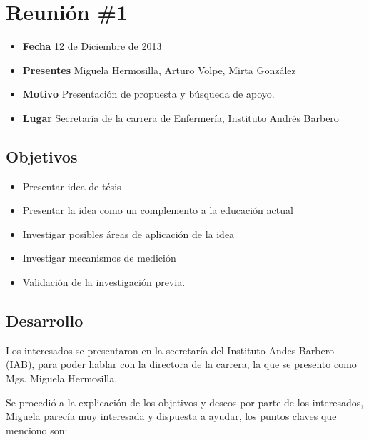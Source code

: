 \section{Reunión \#1}\label{reuniuxf3n-1}

\begin{itemize}
\itemsep1pt\parskip0pt
\item
  \textbf{Fecha} 12 de Diciembre de 2013
\item
  \textbf{Presentes} Miguela Hermosilla, Arturo Volpe, Mirta González
\item
  \textbf{Motivo} Presentación de propuesta y búsqueda de apoyo.
\item
  \textbf{Lugar} Secretaría de la carrera de Enfermería, Instituto
  Andrés Barbero
\end{itemize}

\subsection{Objetivos}\label{objetivos}

\begin{itemize}
\itemsep1pt\parskip0pt
\item
  Presentar idea de tésis
\item
  Presentar la idea como un complemento a la educación actual
\item
  Investigar posibles áreas de aplicación de la idea
\item
  Investigar mecanismos de medición
\item
  Validación de la investigación previa.
\end{itemize}

\subsection{Desarrollo}\label{desarrollo}

Los interesados se presentaron en la secretaría del Instituto Andes
Barbero (IAB), para poder hablar con la directora de la carrera, la que
se presento como Mgs. Miguela Hermosilla.

Se procedió a la explicación de los objetivos y deseos por parte de los
interesados, Miguela parecía muy interesada y dispuesta a ayudar, los
puntos claves que menciono son:

